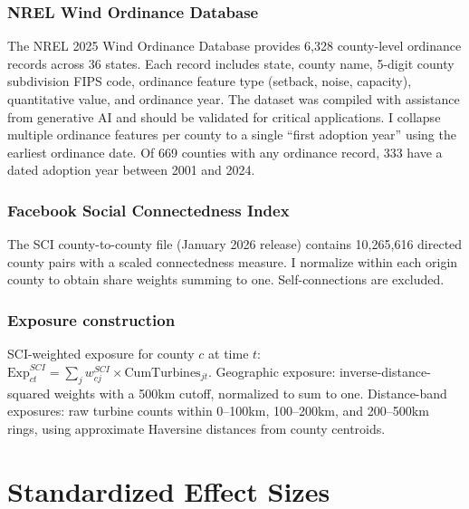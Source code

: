 \documentclass[12pt]{article}
\begin{document}
\subsubsection*{NREL Wind Ordinance Database} The NREL 2025 Wind Ordinance Database provides 6,328 county-level ordinance records across 36 states. Each record includes state, county name, 5-digit county subdivision FIPS code, ordinance feature type (setback, noise, capacity), quantitative value, and ordinance year. The dataset was compiled with assistance from generative AI and should be validated for critical applications. I collapse multiple ordinance features per county to a single ``first adoption year'' using the earliest ordinance date. Of 669 counties with any ordinance record, 333 have a dated adoption year between 2001 and 2024.

\subsubsection*{Facebook Social Connectedness Index} The SCI county-to-county file (January 2026 release) contains 10,265,616 directed county pairs with a scaled connectedness measure. I normalize within each origin county to obtain share weights summing to one. Self-connections are excluded.

\subsubsection*{Exposure construction} SCI-weighted exposure for county $c$ at time $t$: $\text{Exp}^{SCI}_{ct} = \sum_{j} w^{SCI}_{cj} \times \text{CumTurbines}_{jt}$. Geographic exposure: inverse-distance-squared weights with a 500km cutoff, normalized to sum to one. Distance-band exposures: raw turbine counts within 0--100km, 100--200km, and 200--500km rings, using approximate Haversine distances from county centroids.


\section{Standardized Effect Sizes}
\label{sec:sde}


\end{document}
